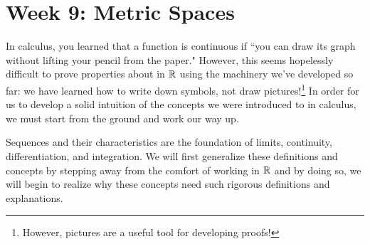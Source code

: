 \documentclass[../main.tex]{subfiles}
\begin{document}
\section{Week 9: Metric Spaces}
In calculus, you learned that a function is continuous if ``you can draw its graph without lifting your pencil from the paper." However, this seems hopelessly difficult to prove properties about in $\mathbb R$ using the machinery we've developed so far: we have learned how to write down symbols, not draw pictures!\footnote{However, pictures are a useful tool for developing proofs!} In order for us to develop a solid intuition of the concepts we were introduced to in calculus, we must start from the ground and work our way up.

Sequences and their characteristics are the foundation of limits, continuity, differentiation, and integration. We will first generalize these definitions and concepts by stepping away from the comfort of working in $\mathbb R$ and by doing so, we will begin to realize why these concepts need such rigorous definitions and explanations.
\end{document}
